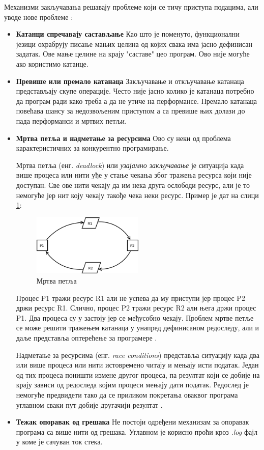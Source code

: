 \documentclass[12pt,oneside]{memoir}
\begin{document}
Механизми закључавања решавају проблеме који се тичу приступа подацима, али уводе нове проблеме \cite{progInScala3}:
\begin{itemize}
\item \textbf{Катанци спречавају састављање} Као што је поменуто, функционални језици охрабрују писање мањих целина од којих свака има јасно дефинисан задатак. Ове мање целине на крају "саставе" цео програм. Ово није могуће ако користимо катанце.
\item \textbf{Превише или премало катанаца} Закључавање и откључавање катанаца представљају скупе операције. Често није јасно колико је катанаца потребно да програм ради како треба а да не утиче на перформансе. Премало катанаца повећава шансу за недозвољеним приступом а са превише њих долази до пада перформанси и мртвих петљи.
\item \textbf{Мртва петља и надметање за ресурсима} Ово су неки од проблема карактеристичних за конкурентно програмирање.

Мртва петља (енг. \textit{deadlock}) или \textit{узајамно закључавање} је ситуација када више процеса или нити уђе у стање чекања због тражења ресурса који није доступан. Све ове нити чекају да им нека друга ослободи ресурс, али је то немогуће јер нит коју чекају такође чека неки ресурс. Пример је дат на слици \ref{fig:deadlock}:
\begin{figure}[!ht]
  \centering
  \includegraphics[width=0.5\textwidth]{deadlock.png}
  \caption{Мртва петља}
  \label{fig:deadlock}
\end{figure}
Процес P1 тражи ресурс R1 али не успева да му приступи јер процес P2 држи ресурс R1. Слично, процес P2 тражи ресурс R2 али њега држи процес P1. Два процеса су у застоју јер се међусобно чекају. Проблем мртве петље се може решити тражењем катанаца у унапред дефинисаном редоследу, али и даље представља оптерећење за програмере \cite{microsoftRaceC}.

Надметање за ресурсима (енг. \textit{race conditions}) представља ситуацију када два или више процеса или нити истовремено читају и мењају исти податак. Један од тих процеса поништи измене другог процеса, па резултат који се добије на крају зависи од редоследа којим процеси мењају дати податак. Редослед је немогуће предвидети тако да се приликом покретања оваквог програма углавном сваки пут добије другачији резултат \cite{microsoftRaceC}.

\item \textbf{Тежак опоравак од грешака} Не постоји одређени механизам за опоравак програма са више нити од грешака. Углавном је корисно проћи кроз \textit{.log} фајл у коме је сачуван ток стека.
\end{itemize}
\end{document}
